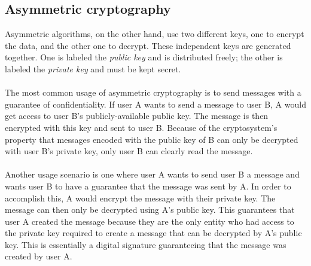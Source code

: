 \documentclass[Lau,binding=0.6cm,oneside]{sapthesis}
\begin{document}
\subsection{Asymmetric cryptography}
Asymmetric algorithms, on the other hand, use two different keys, one to encrypt the data, and the other one to decrypt. These independent keys are generated together. One is labeled the \textit{public key} and is distributed freely; the other is labeled the \textit{private key} and must be kept secret\supercite{asymmetric}.\\\\
The most common usage of asymmetric cryptography is to send messages with a guarantee of confidentiality. If user A wants to send a message to user B, A would get access to user B's publicly-available public key. The message is then encrypted with this key and sent to user B. Because of the cryptosystem's property that messages encoded with the public key of B can only be decrypted with user B's private key, only user B can clearly read the message.\\\\
Another usage scenario is one where user A wants to send user B a message and wants user B to have a guarantee that the message was sent by A. In order to accomplish this, A would encrypt the message with their private key. The message can then only be decrypted using A's public key. This guarantees that user A created the message because they are the only entity who had access to the private key required to create a message that can be decrypted by A's public key. This is essentially a digital signature guaranteeing that the message was created by user A.
\end{document}
